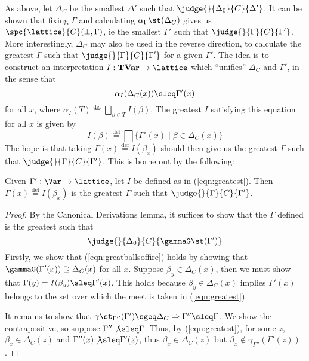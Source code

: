 \documentclass{sigplanconf}
\newcommand{\eqdef}{\mathrel{\stackrel{{\scriptscriptstyle\mathrm{def}}}{=}}}
\newcommand{\SetDef}[2]{ \{ #1 \; | \; #2 \} }
\newcommand{\setName}[1]{\mathrm{\mathbf{#1}}}
\newcommand{\TVar}{\setName{TVar}}
\begin{document}
As above, let
$\Delta_C$ be the smallest $\Delta'$ such that $\judge{}{\Delta_0}{C}{\Delta'}$.
It can be shown that fixing $\Gamma$ and calculating
$\alpha_\Gamma\st(\Delta_C)$ gives us
$\spc{\lattice}{C}(\perp,\Gamma)$, ie
the smallest
$\Gamma'$ such that $\judge{}{\Gamma}{C}{\Gamma'}$.
More interestingly, $\Delta_C$ may also be used
in the reverse direction,
to calculate the greatest $\Gamma$ such that $\judge{}{\Gamma}{C}{\Gamma'}$
for a given $\Gamma'$.
The idea is to construct an interpretation
$I:\TVar -> \lattice$
which ``unifies'' $\Delta_C$ and $\Gamma'$, in the sense that
\begin{equation}
    \alpha_I(\Delta_C(x)) \sleq \Gamma'(x)
\end{equation}
for all $x$, where $\alpha_I(T) \eqdef \bigsqcup_{\beta \in T}I(\beta)$.
The greatest $I$ satisfying this equation for all $x$ is given by
\begin{equation}\label{eqn:greatest}
    I(\beta) \eqdef \bigsqcap \SetDef{\Gamma'(x)}{\beta \in \Delta_C(x)}
\end{equation}
The hope is that taking $\Gamma(x) \eqdef I(\beta_x)$ should then
give us the greatest $\Gamma$ such that $\judge{}{\Gamma}{C}{\Gamma'}$.
This is borne out by the following:
\begin{proposition}
Given $\Gamma': \Var -> \lattice$,
let $I$ be defined as in (\ref{eqn:greatest}).
Then $\Gamma(x) \eqdef I(\beta_x)$ is the greatest $\Gamma$ such that $\judge{}{\Gamma}{C}{\Gamma'}$.
\end{proposition}
\begin{proof}
By the Canonical Derivations lemma, it suffices to show that the $\Gamma$
defined is the greatest such that
\begin{equation}\label{eqn:greatballsoffire}
    \judge{}{\Delta_0}{C}{\gammaG\st(\Gamma')}
\end{equation}
Firstly, we show that (\ref{eqn:greatballsoffire}) holds by showing that
$\gammaG(\Gamma'(x)) \supseteq \Delta_C(x)$ for all $x$.
Suppose $\beta_y \in \Delta_C(x)$, then we must show that
$\Gamma(y) = I(\beta_y) \sleq \Gamma'(x)$. This holds because
$\beta_y \in \Delta_C(x)$ implies $\Gamma'(x)$ belongs to the set
over which the meet is taken in (\ref{eqn:greatest}).

It remains to show
that $\gamma\st_{\Gamma''}(\Gamma') \sgeq \Delta_C => \Gamma'' \sleq \Gamma$.
We show the contrapositive,
so suppose $\Gamma'' \not\sleq \Gamma $. Thus, by (\ref{eqn:greatest}),
for some $z$, $\beta_x \in \Delta_C(z)$ and $\Gamma''(x) \not\sleq \Gamma'(z)$,
thus $\beta_x \in \Delta_C(z)$ but $\beta_x \not\in \gamma_{\Gamma''}(\Gamma'(z))$.
\end{proof}
\end{document}
